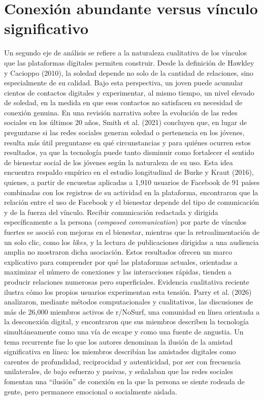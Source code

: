 \section{Conexión abundante versus vínculo significativo}
Un segundo eje de análisis se refiere a la naturaleza cualitativa de los vínculos que las plataformas digitales permiten construir. Desde la definición de Hawkley y Cacioppo (2010), la soledad depende no solo de la cantidad de relaciones, sino especialmente de su calidad. Bajo esta perspectiva, un joven puede acumular cientos de contactos digitales y experimentar, al mismo tiempo, un nivel elevado de soledad, en la medida en que esos contactos no satisfacen su necesidad de conexión genuina. En una revisión narrativa sobre la evolución de las redes sociales en los últimos 20 años, Smith et al. (2021) concluyen que, en lugar de preguntarse si las redes sociales generan soledad o pertenencia en los jóvenes, resulta más útil preguntarse en qué circunstancias y para quiénes ocurren estos resultados, ya que la tecnología puede tanto disminuir como fortalecer el sentido de bienestar social de los jóvenes según la naturaleza de su uso.
Esta idea encuentra respaldo empírico en el estudio longitudinal de Burke y Kraut (2016), quienes, a partir de encuestas aplicadas a 1,910 usuarios de Facebook de 91 países combinadas con los registros de su actividad en la plataforma, encontraron que la relación entre el uso de Facebook y el bienestar depende del tipo de comunicación y de la fuerza del vínculo. Recibir comunicación redactada y dirigida específicamente a la persona (\textit{composed communication}) por parte de vínculos fuertes se asoció con mejoras en el bienestar, mientras que la retroalimentación de un solo clic, como los \textit{likes}, y la lectura de publicaciones dirigidas a una audiencia amplia no mostraron dicha asociación. Estos resultados ofrecen un marco explicativo para comprender por qué las plataformas actuales, orientadas a maximizar el número de conexiones y las interacciones rápidas, tienden a producir relaciones numerosas pero superficiales.
Evidencia cualitativa reciente ilustra cómo los propios usuarios experimentan esta tensión. Parry et al. (2026) analizaron, mediante métodos computacionales y cualitativos, las discusiones de más de 26,000 miembros activos de r/NoSurf, una comunidad en línea orientada a la desconexión digital, y encontraron que sus miembros describen la tecnología simultáneamente como una vía de escape y como una fuente de angustia. Un tema recurrente fue lo que los autores denominan la ilusión de la amistad significativa en línea: los miembros describían las amistades digitales como carentes de profundidad, reciprocidad y autenticidad, por ser con frecuencia unilaterales, de bajo esfuerzo y pasivas, y señalaban que las redes sociales fomentan una ``ilusión'' de conexión en la que la persona se siente rodeada de gente, pero permanece emocional o socialmente aislada.

